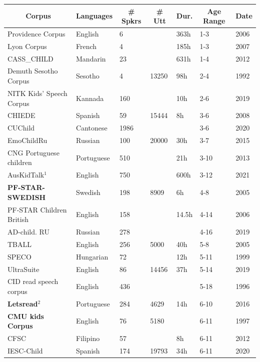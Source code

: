 \begin{table}
\small
\begin{tabular}{|l|l|l|l|l|l|l|} 
\hline
\multicolumn{1}{|c|}{\textbf{Corpus}} & \multicolumn{1}{c|}{\textbf{Languages}} & \multicolumn{1}{c|}{\textbf{\# Spkrs}} & \multicolumn{1}{c|}{\textbf{\# Utt}} & \multicolumn{1}{c|}{\textbf{Dur.}} & \multicolumn{1}{c|}{\textbf{Age Range}} & \multicolumn{1}{c|}{\textbf{Date}} \\ 
\hline
Providence Corpus \cite{providence} & English & 6 &  & 363h & 1-3 & 2006 \\ 
\hline
Lyon Corpus \cite{LyonSC} & French & 4 &  & 185h & 1-3 & 2007 \\ 
\hline
CASS\_CHILD \cite{cass_child} & Mandarin & 23 &  & 631h & 1-4 & 2012 \\ 
\hline
Demuth Sesotho Corpus \cite{demuth1992acquisition} & Sesotho & 4 & 13250 & 98h & 2-4 & 1992 \\ 
\hline
NITK Kids’ Speech Corpus \cite{nitk} & Kannada & 160 &  & 10h & 2-6 & 2019 \\ 
\hline
CHIEDE \cite{chiede} & Spanish & 59 & 15444 & 8h & 3-6 & 2008 \\ 
\hline
CUChild \cite{cuchild} & Cantonese & 1986 &  &  & 3-6 & 2020 \\ 
\hline
EmoChildRu \cite{emochildru} & Russian & 100 & 20000 & 30h & 3-7 & 2015 \\ 
\hline
CNG Portuguese children\cite{hamalainen2013cng} & Portuguese & 510 &  & 21h & 3-10 & 2013 \\ 
\hline
AusKidTalk$^1$ \cite{ahmed2021auskidtalk} & English & 750 &  & 600h & 3-12 & 2021 \\ 
\hline
\textbf{PF-STAR-SWEDISH} \cite{pfstar}
& Swedish & 198 & 8909 & 6h & 4-8 & 2005 \\ 
\hline
PF-STAR Children British \cite{pfstar,russell2006pf,pf-star-british} & English & 158 &  & 14.5h & 4-14 & 2006 \\ 
\hline
AD-child. RU \cite{ad-child_ru} & Russian & 278 &  &  & 4-16 & 2019 \\ 
\hline
TBALL \cite{tball} & English & 256 & 5000 & 40h & 5-8 & 2005 \\ 
\hline
SPECO \cite{speco} & Hungarian & 72 &  & 12h & 5-11 & 1999 \\ 
\hline
UltraSuite\cite{eshky2019ultrasuite} & English & 86 & 14456 & 37h & 5-14 & 2019 \\ 
\hline
CID read speech corpus \cite{lee1999acoustics} & English & 436 &  &  & 5-18 & 1996 \\ 
\hline
\textbf{Letsread$^2$} \cite{letsread} & Portuguese & 284 & 4629 & 14h & 6-10 & 2016 \\ 
\hline
\textbf{CMU kids Corpus} \cite{cmu} & English & 76 & 5180 &  & 6-11 & 1997 \\ 
\hline
CFSC \cite{CFSC} & Filipino & 57 &  & 8h & 6-11 & 2012 \\ 
\hline
IESC-Child \cite{PEREZESPINOSA202055} & Spanish & 174 & 19793 & 34h & 6-11 & 2020 \\ 
\hline


\end{tabular}
\end{table}
